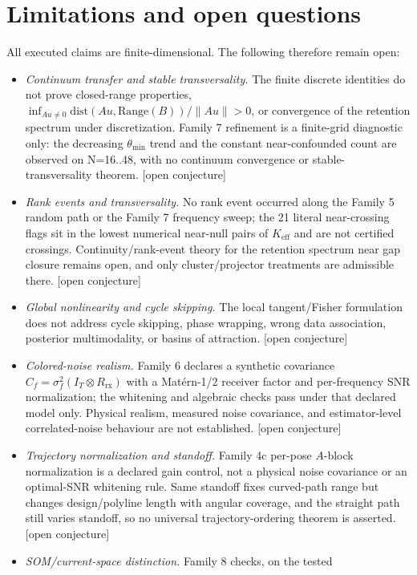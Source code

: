 \documentclass[12pt]{article}
\newcommand{\OPN}{\textnormal{[open conjecture]}}
\begin{document}
\section{Limitations and open questions}\label{sec:limits}

All executed claims are finite-dimensional. The following therefore remain
open:
\begin{itemize}
\item \emph{Continuum transfer and stable transversality.} The finite
discrete identities do not prove closed-range properties,
$\inf_{Au\ne0}\mathrm{dist}(Au,\mathrm{Range}(B))/\|Au\|>0$, or convergence of
the retention spectrum under discretization. Family 7 refinement is a
finite-grid diagnostic only: the decreasing $\theta_{\min}$ trend and the
constant near-confounded count are observed on N=16..48, with no continuum
convergence or stable-transversality theorem. \OPN{}
\item \emph{Rank events and transversality.} No rank event occurred along the
Family 5 random path or the Family 7 frequency sweep; the 21 literal
near-crossing flags sit in the lowest numerical near-null pairs of
$K_{\mathrm{eff}}$ and are not certified crossings. Continuity/rank-event
theory for the retention spectrum near gap closure remains open, and only
cluster/projector treatments are admissible there. \OPN{}
\item \emph{Global nonlinearity and cycle skipping.} The local tangent/Fisher
formulation does not address cycle skipping, phase wrapping, wrong data
association, posterior multimodality, or basins of attraction. \OPN{}
\item \emph{Colored-noise realism.} Family 6 declares a synthetic covariance
$C_f=\sigma_f^2(I_T\otimes R_{\mathrm{rx}})$ with a Mat\'ern-1/2 receiver
factor and per-frequency SNR normalization; the whitening and algebraic
checks pass under that declared model only. Physical realism, measured noise
covariance, and estimator-level correlated-noise behaviour are not
established. \OPN{}
\item \emph{Trajectory normalization and standoff.} Family 4c per-pose
$A$-block normalization is a declared gain control, not a physical noise
covariance or an optimal-SNR whitening rule. Same standoff fixes curved-path
range but changes design/polyline length with angular coverage, and the
straight path still varies standoff, so no universal trajectory-ordering
theorem is asserted. \OPN{}
\item \emph{SOM/current-space distinction.} Family 8 checks, on the tested

\end{itemize}
\end{document}

